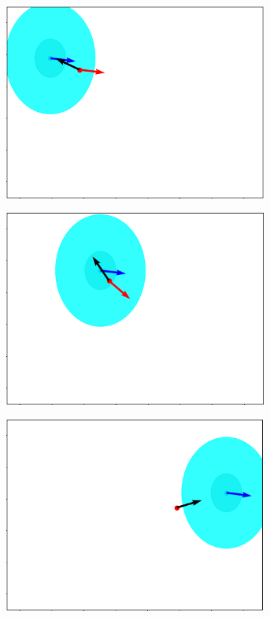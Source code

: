 \documentclass{kuisthesis}
\begin{document}
\begin{itemize}
\begin{figure}[H]
\begin{subfigure}{0.25\textwidth}
  \end{subfigure}
  \begin{subfigure}{0.25\textwidth}
    \includegraphics[width=0.95\textwidth]{img/simulation2.png}
  \end{subfigure}
  \begin{subfigure}{0.25\textwidth}
    \includegraphics[width=0.95\textwidth]{img/simulation3.png}
  \end{subfigure}
  \begin{subfigure}{0.25\textwidth}
    \includegraphics[width=0.95\textwidth]{img/simulation4.png}

\end{subfigure}
\end{figure}
\end{itemize}
\end{document}

